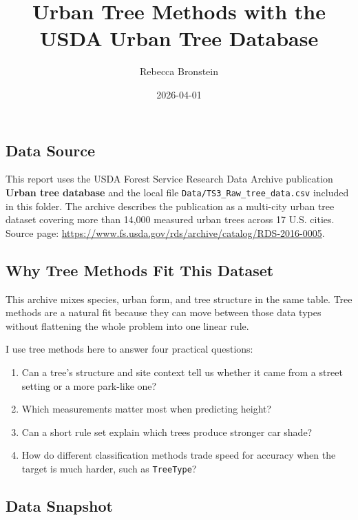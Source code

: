 \documentclass[
  11pt,
]{article}
\title{Urban Tree Methods with the USDA Urban Tree Database}
\author{Rebecca Bronstein}
\date{2026-04-01}
\providecommand{\tightlist}{%
  \setlength{\itemsep}{0pt}\setlength{\parskip}{0pt}}
\begin{document}
\maketitle

{
\setcounter{tocdepth}{2}
\tableofcontents
}
\subsection{Data Source}\label{data-source}

This report uses the USDA Forest Service Research Data Archive
publication \textbf{Urban tree database} and the local file
\texttt{Data/TS3\_Raw\_tree\_data.csv} included in this folder. The
archive describes the publication as a multi-city urban tree dataset
covering more than 14,000 measured urban trees across 17 U.S. cities.
Source page:
\url{https://www.fs.usda.gov/rds/archive/catalog/RDS-2016-0005}.

\subsection{Why Tree Methods Fit This
Dataset}\label{why-tree-methods-fit-this-dataset}

This archive mixes species, urban form, and tree structure in the same
table. Tree methods are a natural fit because they can move between
those data types without flattening the whole problem into one linear
rule.

I use tree methods here to answer four practical questions:

\begin{enumerate}
\def\labelenumi{\arabic{enumi}.}
\tightlist
\item
  Can a tree's structure and site context tell us whether it came from a
  street setting or a more park-like one?
\item
  Which measurements matter most when predicting height?
\item
  Can a short rule set explain which trees produce stronger car shade?
\item
  How do different classification methods trade speed for accuracy when
  the target is much harder, such as \texttt{TreeType}?
\end{enumerate}

\subsection{Data Snapshot}\label{data-snapshot}
\end{document}
